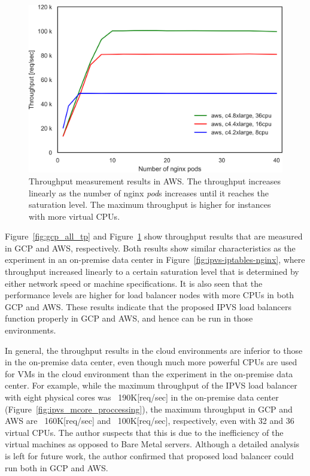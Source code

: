 \begin{figure}[h]
  \centering
  \includegraphics[width=0.75\columnwidth]{Figs/aws_c4_tp}
  \par\bigskip
  \centering
  \begin{minipage}{0.9\columnwidth}
    \caption[Throughput measurement results in AWS]{
Throughput measurement results in AWS.
The throughput increases linearly as the number of nginx {\em pod}s increases until it reaches the saturation level.
The maximum throughput is higher for instances with more virtual CPUs.
    }
    \label{fig:aws_c4_tp}
  \end{minipage}
\end{figure}

Figure~\ref{fig:gcp_all_tp} and Figure~\ref{fig:aws_c4_tp} show throughput results that are measured in GCP and AWS, respectively. 
Both results show similar characteristics as the experiment in an on-premise data center in Figure~\ref{fig:ipvs-iptables-nginx}, where throughput increased linearly to a certain saturation level that is determined by either network speed or machine specifications.
It is also seen that the performance levels are higher for load balancer nodes with more CPUs in both GCP and AWS. 
These results indicate that the proposed IPVS load balancers function properly in GCP and AWS, and hence can be run in those environments.

In general, the throughput results in the cloud environments are inferior to those in the on-premise data center, even though much more powerful CPUs are used for VMs in the cloud environment than the experiment in the on-premise data center.
For example, while the maximum throughput of the IPVS load balancer with eight physical cores was ~190K[req/sec] in the on-premise data center (Figure~\ref{fig:ipvs_mcore_proccessing}), the maximum throughput in GCP and AWS are ~160K[req/sec] and ~100K[req/sec], respectively, even with 32 and 36 virtual CPUs.
The author suspects that this is due to the inefficiency of the virtual machines as opposed to Bare Metal servers.
Although a detailed analysis is left for future work, the author confirmed that proposed load balancer could run both in GCP and AWS.


